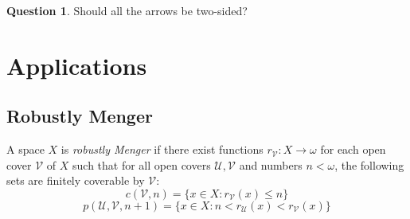 \documentclass{beamer}
\theoremstyle{example}
\theoremstyle{definition}
\newtheorem{question}[theorem]{Question}
\newcommand{\kmarkwin}[1]{\underset{#1\text{-mark}}{\uparrow}}
\newcommand{\ktactwin}[1]{\underset{#1\text{-tact}}{\uparrow}}
\newcommand{\oneptlind}[1]{#1^\dagger} %
\newcommand{\menGame}[1]{Men_{C,F}\left({#1}\right)}
\newcommand{\schFillStrictGame}[1]{Sch^{\cup,\subset}_{C,F}\left({#1}\right)}
\newcommand{\schFillGame}[1]{Sch^{\cup,\subseteq}_{C,F}\left({#1}\right)}
\newcommand{\schFillInitialGame}[1]{Sch^{1,\subseteq}_{C,F}\left({#1}\right)}
\newcommand{\schFillIntGame}[1]{Sch^{\cap}_{C,F}\left({#1}\right)}
\newcommand{\<}{\langle}
\renewcommand{\>}{\rangle}
\newcommand{\mc}[1]{\mathcal{#1}}
\newcommand{\alcompS}[1]{S(#1)}
\newcommand{\pl}[1]{\mathscr{#1}}
\newcommand{\term}{\textit}
\begin{document}
\begin{frame}[fragile]
  \begin{theorem}\tiny
  \begin{center}
  \end{center}
  \end{theorem}

  \pause

  \begin{question}
    Should all the arrows be two-sided?
  \end{question}
\end{frame}

\section{Applications}

\subsection{Robustly Menger}

\begin{frame}
  \begin{definition}
    A space \(X\) is \term{robustly Menger}
    if there exist functions \(r_{\mc V}:X\to\omega\)
    for each open cover \(\mc V\) of \(X\) such that
    for all open covers \(\mc U,\mc V\) and numbers \(n<\omega\),
    the following sets are finitely coverable by \(\mc V\):
      \[
        c(\mc V,n)=\{ x\in X : r_{\mc V}(x)\leq n\}
      \]
      \[
        p(\mc U,\mc V,n+1)=\{ x\in X : n<r_{\mc U}(x)<r_{\mc V}(x)\}
      \]
  \end{definition}
\end{frame}
\end{document}
